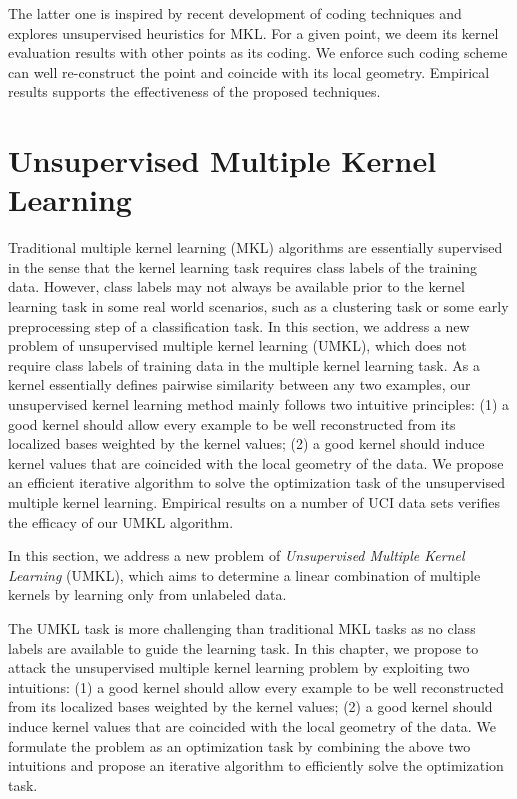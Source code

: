 The latter one is inspired by recent development of coding techniques and explores unsupervised heuristics for MKL\cite{ml/BalcanBV06}\cite{nips/YuZG09}\cite{aistats/ZhuangTH11}. For a given point, we deem its kernel evaluation results with other points as its coding. We enforce such coding scheme can well re-construct the point and coincide with its local geometry. Empirical results supports the effectiveness of the proposed techniques.

\section{Unsupervised Multiple Kernel Learning}

Traditional multiple kernel learning (MKL) algorithms are essentially supervised in the sense that the kernel learning task requires class labels of the training data. However, class labels may not always be available prior to the kernel learning task in some real world scenarios, such as a clustering task or some early preprocessing step of a classification task.
In this section, we address a new problem of unsupervised multiple kernel learning (UMKL), which does not require class labels of training data in the multiple kernel learning task. As a kernel essentially defines pairwise similarity between any two examples, our unsupervised kernel learning method mainly follows two intuitive principles: (1) a good kernel should allow every example to be well reconstructed from its localized bases weighted by the kernel values; (2) a good kernel should induce kernel values that are coincided with the local geometry of the data. We propose an efficient iterative algorithm to solve the optimization task of the unsupervised multiple kernel learning. Empirical results on a number of UCI data sets verifies the efficacy of our UMKL algorithm.

In this section, we address a new problem of {\em Unsupervised Multiple Kernel Learning} (UMKL), which aims to determine a linear combination of multiple kernels by learning only from unlabeled data.

The UMKL task is more challenging than traditional MKL tasks as no class labels are available to guide the learning task. In this chapter, we propose to attack the unsupervised multiple kernel learning problem by exploiting two intuitions: (1) a good kernel should allow every example to be well reconstructed from its localized bases weighted by the kernel values; (2) a good kernel should induce kernel values that are coincided with the local geometry of the data. We formulate the problem as an optimization task by combining the above two intuitions and propose an iterative algorithm to efficiently solve the optimization task.

